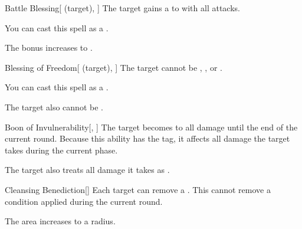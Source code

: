 \lowercase{\hypertarget{spell:Battle Blessing}{}}\label{spell:Battle Blessing}
\begin{attuneability}[Rank 5]{\hypertarget{spell:Battle Blessing}{Battle Blessing}}[ (target), ]
The target gains a   to  with all attacks.

You can cast this spell as a .

\rankline
{} The bonus increases to .

\end{attuneability}
\vspace{0.25em}



\lowercase{\hypertarget{spell:Blessing of Freedom}{}}\label{spell:Blessing of Freedom}
\begin{attuneability}[Rank 5]{\hypertarget{spell:Blessing of Freedom}{Blessing of Freedom}}[ (target), ]
The target cannot be , , or .

You can cast this spell as a .

\rankline
{} The target also cannot be .

\end{attuneability}
\vspace{0.25em}



\lowercase{\hypertarget{spell:Boon of Invulnerability}{}}\label{spell:Boon of Invulnerability}
\begin{freeability}[Rank 6]{\hypertarget{spell:Boon of Invulnerability}{Boon of Invulnerability}}[, ]
The target becomes  to all damage until the end of the current round.
Because this ability has the  tag, it affects all damage the target takes during the current phase.

\rankline
{} The target also treats all damage it takes as .

\end{freeability}
\vspace{0.25em}



\lowercase{\hypertarget{spell:Cleansing Benediction}{}}\label{spell:Cleansing Benediction}
\begin{freeability}[Rank 6]{\hypertarget{spell:Cleansing Benediction}{Cleansing Benediction}}[]
Each target can remove a .
This cannot remove a condition applied during the current round.

\rankline
{} The area increases to a \arealarge radius.

\end{freeability}
\vspace{0.25em}



